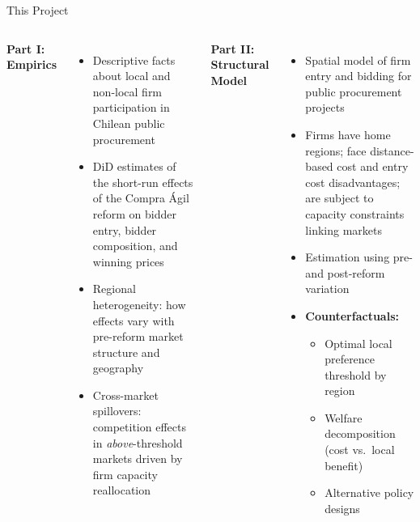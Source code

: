 \documentclass[9pt,aspectratio=169]{beamer}
\begin{document}
\begin{frame}{This Project}
\begin{columns}[T]
  \textbf{Part I: Empirics}
  \begin{itemize}
    \item Descriptive facts about local and non-local firm participation
          in Chilean public procurement
    \item DiD estimates of the short-run effects of the Compra Ágil reform
          on bidder entry, bidder composition, and winning prices
    \item Regional heterogeneity: how effects vary with pre-reform market
          structure and geography
    \item Cross-market spillovers: competition effects in \textit{above}-threshold
          markets driven by firm capacity reallocation
  \end{itemize}

  \textbf{Part II: Structural Model}
  \begin{itemize}
    \item Spatial model of firm entry and bidding for public procurement projects
    \item Firms have home regions; face distance-based cost and entry cost
          disadvantages; are subject to capacity constraints linking markets
    \item Estimation using pre- and post-reform variation
    \item \textbf{Counterfactuals:}
    \begin{itemize}
      \item[-] Optimal local preference threshold by region
      \item[-] Welfare decomposition (cost vs.\ local benefit)
      \item[-] Alternative policy designs
    \end{itemize}
  \end{itemize}
\end{columns}
\end{frame}
\end{document}
